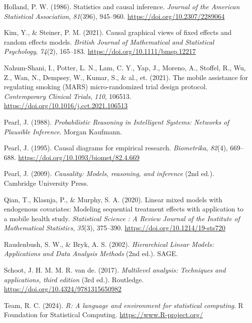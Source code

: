 \documentclass[
  11pt,
  a4paper,
]{article}
\newlength{\cslhangindent}
\newenvironment{CSLReferences}[2] %
 {\begin{list}{}{%
  \setlength{\itemindent}{0pt}
  \setlength{\leftmargin}{0pt}
  \setlength{\parsep}{0pt}
  \ifodd #1
   \setlength{\leftmargin}{\cslhangindent}
   \setlength{\itemindent}{-1\cslhangindent}
  \fi
  \setlength{\itemsep}{#2\baselineskip}}}
 {\end{list}}
\begin{document}
\begin{CSLReferences}{1}{0}
Holland, P. W. (1986). Statistics and causal inference. \emph{Journal of
the American Statistical Association}, \emph{81}(396), 945--960.
\url{https://doi.org/10.2307/2289064}

Kim, Y., \& Steiner, P. M. (2021). Causal graphical views of fixed
effects and random effects models. \emph{British Journal of Mathematical
and Statistical Psychology}, \emph{74}(2), 165--183.
\url{https://doi.org/10.1111/bmsp.12217}

Nahum-Shani, I., Potter, L. N., Lam, C. Y., Yap, J., Moreno, A.,
Stoffel, R., Wu, Z., Wan, N., Dempsey, W., Kumar, S., \& al., et.
(2021). The mobile assistance for regulating smoking (MARS)
micro-randomized trial design protocol. \emph{Contemporary Clinical
Trials}, \emph{110}, 106513.
\url{https://doi.org/10.1016/j.cct.2021.106513}

Pearl, J. (1988). \emph{Probabilistic Reasoning in Intelligent Systems:
Networks of Plausible Inference}. Morgan Kaufmann.

Pearl, J. (1995). Causal diagrams for empirical research.
\emph{Biometrika}, \emph{82}(4), 669--688.
\url{https://doi.org/10.1093/biomet/82.4.669}

Pearl, J. (2009). \emph{Causality: Models, reasoning, and inference}
(2nd ed.). Cambridge University Press.

Qian, T., Klasnja, P., \& Murphy, S. A. (2020). Linear mixed models with
endogenous covariates: Modeling sequential treatment effects with
application to a mobile health study. \emph{Statistical Science : A
Review Journal of the Institute of Mathematical Statistics},
\emph{35}(3), 375--390. \url{https://doi.org/10.1214/19-sts720}

Raudenbush, S. W., \& Bryk, A. S. (2002). \emph{Hierarchical Linear
Models: Applications and Data Analysis Methods} (2nd ed.). SAGE.

Schoot, J. H. M. M. R. van de. (2017). \emph{Multilevel analysis:
Techniques and applications, third edition} (3rd ed.). Routledge.
\url{https://doi.org/10.4324/9781315650982}

Team, R. C. (2024). \emph{R: A language and environment for statistical
computing}. R Foundation for Statistical Computing.
\url{https://www.R-project.org/}


\end{CSLReferences}
\end{document}
